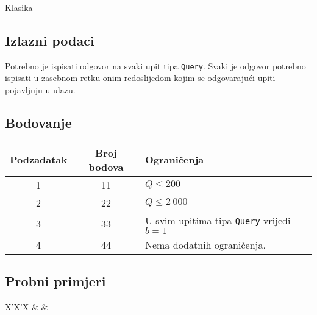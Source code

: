 \begin{statement}[
  problempoints=110,
  timelimit=5 sekundi,
  memorylimit=512 MiB,
]{Klasika}
\subsection*{Izlazni podaci}
Potrebno je ispisati odgovor na svaki upit tipa \texttt{Query}. Svaki je
odgovor potrebno ispisati u zasebnom retku onim redoslijedom kojim se
odgovarajući upiti pojavljuju u ulazu.

 \subsection*{Bodovanje}
{\renewcommand{\arraystretch}{1.4}
  \setlength{\tabcolsep}{6pt}
  \begin{tabular}{ccl}
 Podzadatak & Broj bodova & Ograničenja \\ \midrule
  1 & 11 & $Q \le 200$ \\
  2 & 22 & $Q \le 2\ 000$ \\
  3 & 33 & U svim upitima tipa \texttt{Query} vrijedi $b=1$ \\
  4 & 44 & Nema dodatnih ograničenja.
\end{tabular}}

\subsection*{Probni primjeri}
\begin{tabularx}{\textwidth}{X'X'X}
 &
 &
\end{tabularx}

\end{statement}

